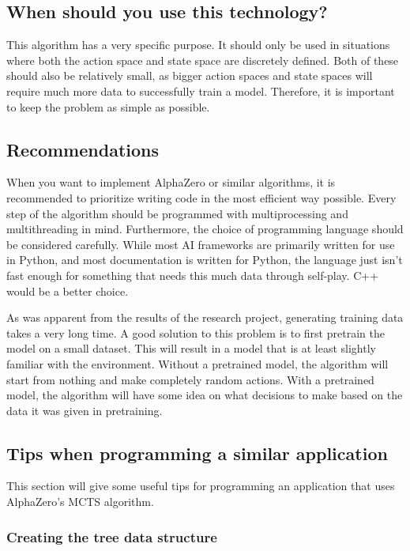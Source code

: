 \documentclass{article}
\begin{document}
\subsection{When should you use this technology?}

This algorithm has a very specific purpose. It should only be used in situations where
both the action space and state space are discretely defined. Both of these should also
be relatively small, as bigger action spaces and state spaces will require much more 
data to successfully train a model. 
Therefore, it is important to keep the problem as simple as possible. 

\subsection{Recommendations}

When you want to implement AlphaZero or similar algorithms, it is recommended to
prioritize writing code in the most efficient way possible. Every step of the algorithm
should be programmed with multiprocessing and multithreading in mind. Furthermore,
the choice of programming language should be considered carefully. While most AI 
frameworks are primarily written for use in Python, and most documentation is written
for Python, the language just isn't fast enough for something that needs this much data through self-play. 
C++ would be a better choice.

As was apparent from the results of the research project, generating training data 
takes a very long time. A good solution to this problem is to first pretrain the model
on a small dataset. This will result in a model that is at least slightly familiar 
with the environment. Without a pretrained model, the algorithm will start from nothing
and make completely random actions. With a pretrained model, the algorithm will have some 
idea on what decisions to make based on the data it was given in pretraining.


\subsection{Tips when programming a similar application}

This section will give some useful tips for programming an application that uses
AlphaZero's MCTS algorithm. 

\subsubsection{Creating the tree data structure}
\end{document}
